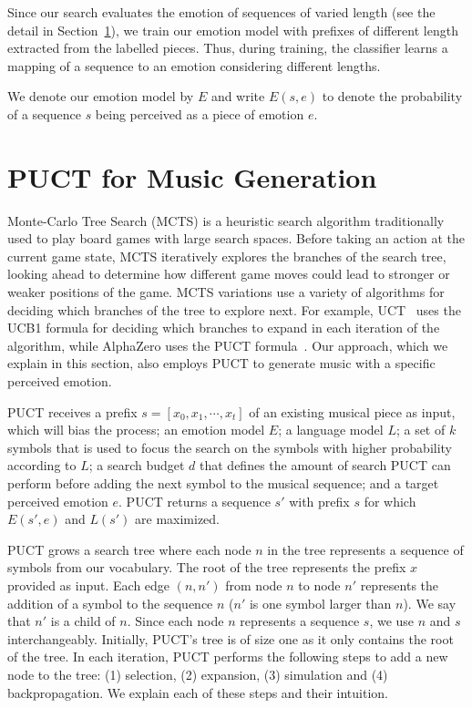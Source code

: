 Since our search evaluates the emotion of sequences of varied length (see the detail in Section~\ref{sec:puct}),
we train our emotion model with
prefixes of different length extracted from the labelled pieces. Thus, during training, the classifier
learns a mapping of a sequence to an emotion considering different lengths. %

We denote our emotion model by $E$ and write $E(s, e)$ to denote the probability of a sequence $s$ being perceived as a piece of emotion $e$.

\section{PUCT for Music Generation}
\label{sec:puct}

Monte-Carlo Tree Search (MCTS) is a heuristic search algorithm traditionally used to
play board games with large search spaces. Before taking
an action at the current game state, MCTS iteratively explores
the branches of the search tree, looking ahead to determine how different game moves could lead to stronger or weaker positions of the game. MCTS variations use a variety of algorithms for deciding which branches of the tree to explore next. For example, UCT~\cite{Kocsis2006} uses the UCB1 formula for deciding which branches to expand in each iteration of the algorithm, while AlphaZero  uses the PUCT formula~\cite{rosin2011pucb}. Our approach, which we explain in this section, also employs PUCT to generate music with a specific perceived emotion.

PUCT receives a prefix $s = [x_0, x_1, \cdots, x_t]$ of an existing musical piece as input, which will bias the process; an emotion model $E$; a language model $L$; a set of $k$ symbols that is used to focus the search on the symbols with higher probability according to $L$; a search budget $d$ that defines the amount of search PUCT can perform before adding the next symbol to the musical sequence; and a target perceived emotion $e$. PUCT returns a sequence $s'$ with prefix $s$ for which $E(s', e)$ and $L(s')$ are maximized. %

PUCT grows a search tree where each node $n$ in the tree represents a sequence of symbols from our vocabulary. The root of the tree represents the prefix $x$ provided as input. Each edge $(n, n')$ from node $n$ to node $n'$ represents the addition of a symbol to the sequence $n$ ($n'$ is one symbol larger than $n$). We say that $n'$ is a child of $n$. Since each node $n$ represents a sequence $s$, we use $n$ and $s$ interchangeably.  %
Initially, PUCT's tree is of size one as it only contains the root of the tree. In each iteration, PUCT performs the following steps to add a new node to the tree: (1) selection, (2) expansion, (3) simulation and (4) backpropagation. We explain each of these steps and their intuition.

